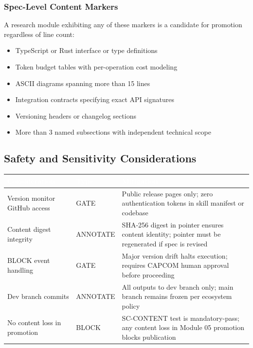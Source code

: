 \documentclass[11pt,letterpaper]{article}
\newcommand{\tableheader}[1]{\textbf{\sffamily\textcolor{white}{#1}}}
\begin{document}
\subsubsection{Spec-Level Content Markers}

A research module exhibiting any of these markers is a candidate for promotion regardless of line count:

\begin{itemize}[noitemsep]
  \item TypeScript or Rust interface or type definitions
  \item Token budget tables with per-operation cost modeling
  \item ASCII diagrams spanning more than 15 lines
  \item Integration contracts specifying exact API signatures
  \item Versioning headers or changelog sections
  \item More than 3 named subsections with independent technical scope
\end{itemize}

\subsection{Safety and Sensitivity Considerations}

\begin{center}
\begin{tabularx}{\textwidth}{L{4cm}L{2cm}X}
\toprule
{}
\tableheader{Consideration} & \tableheader{Type} & \tableheader{Mitigation} \\
\midrule
Version monitor GitHub access & GATE & Public release pages only; zero authentication tokens in skill manifest or codebase \\
Content digest integrity & ANNOTATE & SHA-256 digest in pointer ensures content identity; pointer must be regenerated if spec is revised \\
BLOCK event handling & GATE & Major version drift halts execution; requires CAPCOM human approval before proceeding \\
Dev branch commits & ANNOTATE & All outputs to dev branch only; main branch remains frozen per ecosystem policy \\
No content loss in promotion & BLOCK & SC-CONTENT test is mandatory-pass; any content loss in Module 05 promotion blocks publication \\
\bottomrule
\end{tabularx}
\end{center}
\end{document}
